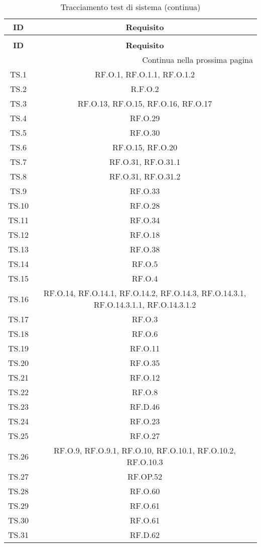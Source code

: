 \bgroup
\begin{adjustwidth}{-0.5cm}{-0.5cm}
	\centering
  \begin{longtable}{|c|c|}
		\caption{Tracciamento test di sistema}
  	\label{tab:tracciamento-test-sistema} \\
    \hline
		\textbf{ID} & \textbf{Requisito} \\ 
		\hline
		\endfirsthead

		\caption[]{Tracciamento test di sistema (continua)} \\
		\hline
		\textbf{ID} & \textbf{Requisito} \\ 
		\hline
		\endhead

		\hline
		\multicolumn{2}{|r|}{{Continua nella prossima pagina}} \\ 
		\hline
		\endfoot

		\hline
		\endlastfoot

    TS.1 & RF.O.1, RF.O.1.1, RF.O.1.2\\
		\hline TS.2 & R.F.O.2\\
		\hline TS.3 & RF.O.13, RF.O.15, RF.O.16, RF.O.17\\
		\hline TS.4 & RF.O.29\\
		\hline TS.5 & RF.O.30\\
		\hline TS.6 & RF.O.15, RF.O.20\\
		\hline TS.7 & RF.O.31, RF.O.31.1\\
		\hline TS.8 & RF.O.31, RF.O.31.2\\
		\hline TS.9 & RF.O.33\\
		\hline TS.10 & RF.O.28\\
		\hline TS.11 & RF.O.34\\
		\hline TS.12 & RF.O.18\\
		\hline TS.13 & RF.O.38\\
		\hline TS.14 & RF.O.5\\
		\hline TS.15 & RF.O.4\\
		\hline TS.16 & RF.O.14, RF.O.14.1, RF.O.14.2, RF.O.14.3, RF.O.14.3.1, RF.O.14.3.1.1, RF.O.14.3.1.2\\
		\hline TS.17 & RF.O.3\\
		\hline TS.18 & RF.O.6\\
		\hline TS.19 & RF.O.11\\
		\hline TS.20 & RF.O.35\\
		\hline TS.21 & RF.O.12\\
		\hline TS.22 & RF.O.8\\
		\hline TS.23 & RF.D.46\\
		\hline TS.24 & RF.O.23\\
		\hline TS.25 & RF.O.27\\
		\hline TS.26 & RF.O.9, RF.O.9.1, RF.O.10, RF.O.10.1, RF.O.10.2, RF.O.10.3\\
		\hline TS.27 & RF.OP.52\\
		\hline TS.28 & RF.O.60\\
		\hline TS.29 & RF.O.61\\
		\hline TS.30 & RF.O.61\\
		\hline TS.31 & RF.D.62\\
  \end{longtable}
\end{adjustwidth}
\egroup